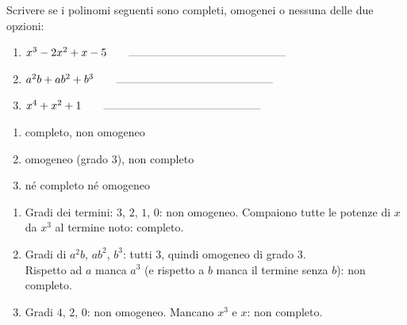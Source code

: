 \begin{question}[ID=0.2, subtitle={Classificazione di polinomi — serie 2}, tags={prodotti, polinomi}, difficulty=facile]
Scrivere se i polinomi seguenti sono completi, omogenei o nessuna delle due opzioni:
\begin{center}\begin{minipage}{0.85\linewidth}
\begin{enumerate}
\item $x^3 - 2x^2 + x - 5 \qquad \rule{5cm}{0.2pt}$
\item $a^2 b + ab^2 + b^3 \qquad \rule{5cm}{0.2pt}$
\item $x^4 + x^2 + 1 \qquad \rule{5cm}{0.2pt}$
\end{enumerate}
\end{minipage}\end{center}
\begin{solution}
\begin{enumerate}
    \item completo, non omogeneo
    \item omogeneo (grado $3$), non completo
    \item né completo né omogeneo
\end{enumerate}
\end{solution}
\begin{explanation}
\begin{enumerate}
    \item Gradi dei termini: $3$, $2$, $1$, $0$: non omogeneo. Compaiono tutte le potenze di $x$ da $x^3$ al termine noto: completo.
    \item Gradi di $a^2b$, $ab^2$, $b^3$: tutti $3$, quindi omogeneo di grado $3$. \\
    Rispetto ad $a$ manca $a^3$ (e rispetto a $b$ manca il termine senza $b$): non completo.
    \item Gradi $4$, $2$, $0$: non omogeneo. Mancano $x^3$ e $x$: non completo.
\end{enumerate}
\end{explanation}
\end{question}


